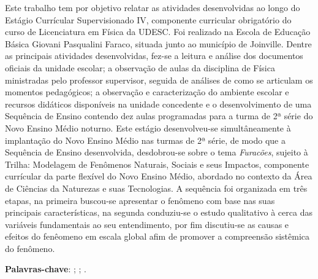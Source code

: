 \setlength{\absparsep}{18pt} %
\begin{resumo}
	\thispagestyle{empty}
	Este trabalho tem por objetivo relatar as atividades desenvolvidas ao longo do Estágio Currícular Supervisionado IV, componente curricular obrigatório do curso de Licenciatura em Física da \ac{UDESC}. Foi realizado na Escola de Educação Básica Giovani Pasqualini Faraco, situada junto ao município de Joinville. Dentre as principais atividades desenvolvidas, fez-se a leitura e análise dos documentos oficiais da unidade escolar; a observação de aulas da disciplina de Física ministradas pelo professor supervisor, seguida de análises de como se articulam os momentos pedagógicos; a observação e caracterização do ambiente escolar e recursos didáticos disponíveis na unidade concedente e o desenvolvimento de uma Sequência de Ensino contendo dez aulas programadas para a turma de 2ª série do Novo Ensino Médio noturno. Este estágio desenvolveu-se simultâneamente à implantação do Novo Ensino Médio nas turmas de 2ª série, de modo que a Sequência de Ensino desenvolvida, desdobrou-se sobre o tema \textit{Furacões}, sujeito à Trilha: Modelagem de Fenômenos Naturais, Sociais e seus Impactos, componente currícular da parte flexível do Novo Ensino Médio, abordado no contexto da Área de Ciências da Naturezas e suas Tecnologias. A sequência foi organizada em três etapas, na primeira buscou-se apresentar o fenômeno com base nas suas principais características, na segunda conduziu-se o estudo qualitativo à cerca das variáveis fundamentais ao seu entendimento, por fim discutiu-se as causas e efeitos do fenêomeno em escala global afim de promover a compreensão sistêmica do fenômeno.

	\textbf{Palavras-chave}: \firstkey ; \secondkey ; \thirdkey.
\end{resumo}
